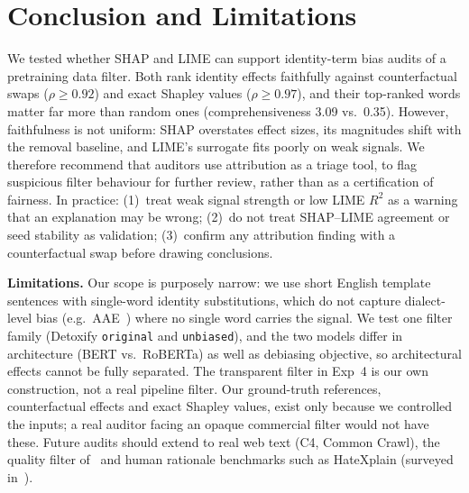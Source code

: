 \section{Conclusion and Limitations}\label{sec:conclusion}

We tested whether SHAP and LIME can support identity-term bias audits of a pretraining data filter.
Both rank identity effects faithfully against counterfactual swaps ($\rho \geq 0.92$) and exact Shapley values ($\rho \geq 0.97$), and their top-ranked words matter far more than random ones (comprehensiveness 3.09 vs.\ 0.35).
However, faithfulness is not uniform: SHAP overstates effect sizes, its magnitudes shift with the removal baseline, and LIME's surrogate fits poorly on weak signals.
We therefore recommend that auditors use attribution as a triage tool, to flag suspicious filter behaviour for further review, rather than as a certification of fairness.
In practice: (1)~treat weak signal strength or low LIME $R^2$ as a warning that an explanation may be wrong; (2)~do not treat SHAP--LIME agreement or seed stability as validation; (3)~confirm any attribution finding with a counterfactual swap before drawing conclusions.

\smallskip
\noindent\textbf{Limitations.}
Our scope is purposely narrow: we use short English template sentences with single-word identity substitutions, which do not capture dialect-level bias (e.g.\ AAE~\cite{sap2019risk}) where no single word carries the signal.
We test one filter family (Detoxify \texttt{original} and \texttt{unbiased}), and the two models differ in architecture (BERT vs.\ RoBERTa) as well as debiasing objective, so architectural effects cannot be fully separated.
The transparent filter in Exp~4 is our own construction, not a real pipeline filter.
Our ground-truth references, counterfactual effects and exact Shapley values, exist only because we controlled the inputs; a real auditor facing an opaque commercial filter would not have these.
Future audits should extend to real web text (C4, Common Crawl), the quality filter of~\cite{gururangan2022whose} and human rationale benchmarks such as HateXplain (surveyed in~\cite{ngueajio2025decoding}).
